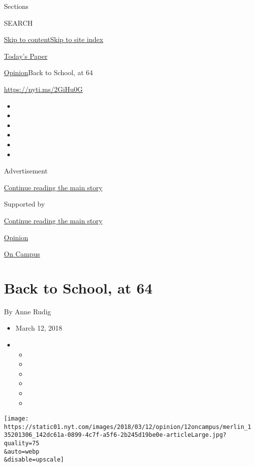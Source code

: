 Sections

SEARCH

\protect\hyperlink{site-content}{Skip to
content}\protect\hyperlink{site-index}{Skip to site index}

\href{https://myaccount.nytimes.com/auth/login?response_type=cookie\&client_id=vi}{}

\href{https://www.nytimes.com/section/todayspaper}{Today's Paper}

\href{/section/opinion}{Opinion}\textbar{}Back to School, at 64

\href{https://nyti.ms/2GiHu0G}{https://nyti.ms/2GiHu0G}

\begin{itemize}
\item
\item
\item
\item
\item
\item
\end{itemize}

Advertisement

\protect\hyperlink{after-top}{Continue reading the main story}

Supported by

\protect\hyperlink{after-sponsor}{Continue reading the main story}

\href{/section/opinion}{Opinion}

\href{/column/on-campus}{On Campus}

\hypertarget{back-to-school-at-64}{%
\section{Back to School, at 64}\label{back-to-school-at-64}}

By Anne Rudig

\begin{itemize}
\item
  March 12, 2018
\item
  \begin{itemize}
  \item
  \item
  \item
  \item
  \item
  \item
  \end{itemize}
\end{itemize}

\texttt{[image: https://static01.nyt.com/images/2018/03/12/opinion/12oncampus/merlin\_135201306\_142dc61a-0899-4c7f-a5f6-2b245d19be0e-articleLarge.jpg?quality=75\\\&auto=webp\\\&disable=upscale]}

